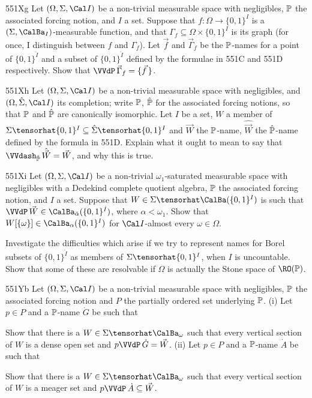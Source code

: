 {

\spheader 551Xg Let $(\Omega,\Sigma,\Cal I)$ be a non-trivial measurable
space
with negligibles, $\Bbb P$ the associated forcing notion, and $I$ a set.
Suppose that $f:\Omega\to\{0,1\}^I$ is a $(\Sigma,\CalBa_I)$-measurable
function, and that $\Gamma_f\subseteq\Omega\times\{0,1\}^I$ is its graph
(for once, I distinguish between $f$ and $\Gamma_f$).   Let $\vec f$ and
$\vec\Gamma_f$ be the $\Bbb P$-names for a point of $\{0,1\}^{\check I}$
and a subset of $\{0,1\}^{\check I}$ defined by the formulae in
551C and 551D respectively.   Show that
$\VVdP\,\vec\Gamma_f=\{\vec f\,\}$.

\spheader 551Xh Let $(\Omega,\Sigma,\Cal I)$ be a non-trivial measurable
space with negligibles, and $(\Omega,\hat\Sigma,\Cal I)$ its completion;
write $\Bbb P$, $\hat{\Bbb P}$ for the associated forcing notions, so that
$\Bbb P$ and $\hat{\Bbb P}$ are canonically isomorphic.
Let $I$ be a set, $W$ a member of
$\Sigma\tensorhat\{0,1\}^I\subseteq\hat\Sigma\tensorhat\{0,1\}^I$ and
$\vec W$ the $\Bbb P$-name, $\hat{\vec W}$ the $\hat{\Bbb P}$-name defined
by the formula in 551D.   Explain what it ought to mean to say that
$\VVdash_{\hat{\Bbb P}}\,\hat{\vec W}=\vec W$, and why this is true.

\spheader 551Xi Let $(\Omega,\Sigma,\Cal I)$ be a non-trivial
$\omega_1$-saturated measurable space with negligibles with a Dedekind
complete quotient algebra,
$\Bbb P$ the associated forcing notion, and $I$ a set.   Suppose that
$W\in\Sigma\tensorhat\CalBa(\{0,1\}^I)$ is such that
$\VVdP\,\vec W\in\CalBa_{\check\alpha}(\{0,1\}^{\check I})$,
where $\alpha<\omega_1$.
Show that $W[\{\omega\}]\in\CalBa_{\alpha}(\{0,1\}^I)$ for
$\Cal I$-almost every $\omega\in\Omega$.

Investigate the difficulties which arise if we try to represent
names for Borel subsets of $\{0,1\}^{\check I}$ as members of
$\Sigma\tensorhat\{0,1\}^I$, when $I$ is uncountable.
Show that some of these are
resolvable if $\Omega$ is actually the Stone space of $\RO(\Bbb P)$.

\spheader 551Yb Let $(\Omega,\Sigma,\Cal I)$ be a non-trivial 
measurable space
with negligibles, $\Bbb P$ the associated forcing notion and
$P$ the partially ordered set underlying $\Bbb P$.
(i) Let $p\in P$
and a $\Bbb P$-name $\dot G$ be such that


\noindent Show that there is a $W\in\Sigma\tensorhat\CalBa_{\omega}$ such that
every vertical section of $W$ is a dense open set and $p\VVdP\,\dot G=\vec W$.
(ii) Let $p\in P$
and a $\Bbb P$-name $\dot A$ be such that


\noindent Show that there is a $W\in\Sigma\tensorhat\CalBa_{\omega}$ such that
every vertical section of $W$ is a meager set and
$p\VVdP\,\dot A\subseteq\vec W$.

}%

